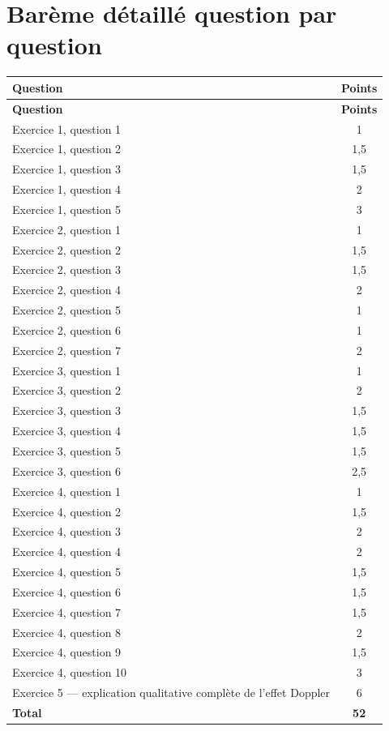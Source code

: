\documentclass[11pt,a4paper]{article}
\begin{document}
\section*{Barème détaillé question par question}

\begin{longtable}{|p{9cm}|c|}
\hline
\textbf{Question} & \textbf{Points} \\
\hline
\endfirsthead
\hline
\textbf{Question} & \textbf{Points} \\
\hline
\endhead

Exercice 1, question 1 & 1 \\
\hline
Exercice 1, question 2 & 1{,}5 \\
\hline
Exercice 1, question 3 & 1{,}5 \\
\hline
Exercice 1, question 4 & 2 \\
\hline
Exercice 1, question 5 & 3 \\
\hline

Exercice 2, question 1 & 1 \\
\hline
Exercice 2, question 2 & 1{,}5 \\
\hline
Exercice 2, question 3 & 1{,}5 \\
\hline
Exercice 2, question 4 & 2 \\
\hline
Exercice 2, question 5 & 1 \\
\hline
Exercice 2, question 6 & 1 \\
\hline
Exercice 2, question 7 & 2 \\
\hline

Exercice 3, question 1 & 1 \\
\hline
Exercice 3, question 2 & 2 \\
\hline
Exercice 3, question 3 & 1{,}5 \\
\hline
Exercice 3, question 4 & 1{,}5 \\
\hline
Exercice 3, question 5 & 1{,}5 \\
\hline
Exercice 3, question 6 & 2{,}5 \\
\hline

Exercice 4, question 1 & 1 \\
\hline
Exercice 4, question 2 & 1{,}5 \\
\hline
Exercice 4, question 3 & 2 \\
\hline
Exercice 4, question 4 & 2 \\
\hline
Exercice 4, question 5 & 1{,}5 \\
\hline
Exercice 4, question 6 & 1{,}5 \\
\hline
Exercice 4, question 7 & 1{,}5 \\
\hline
Exercice 4, question 8 & 2 \\
\hline
Exercice 4, question 9 & 1{,}5 \\
\hline
Exercice 4, question 10 & 3 \\
\hline

Exercice 5 --- explication qualitative complète de l'effet Doppler & 6 \\
\hline

\textbf{Total} & \textbf{52} \\
\hline
\end{longtable}
\end{document}
